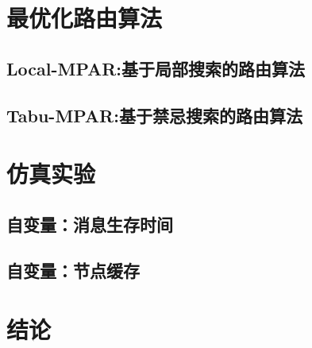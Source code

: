 \section{最优化路由算法}
\label{chap3:最优化路由算法}

\subsection{Local-MPAR:基于局部搜索的路由算法}

\subsection{Tabu-MPAR:基于禁忌搜索的路由算法}

\section{仿真实验}
\label{chap3:仿真实验}

\subsection{自变量：消息生存时间}

\subsection{自变量：节点缓存}

\section{结论}
\label{chap3:结论}






